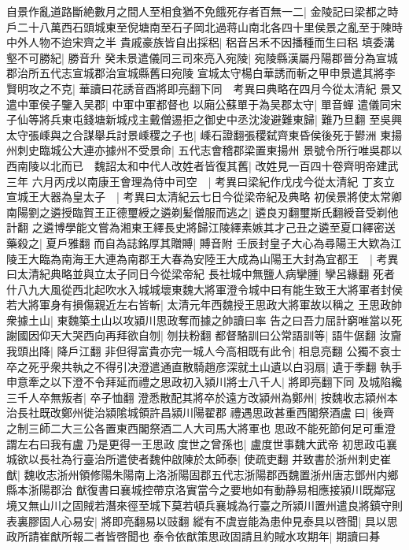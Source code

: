 自景作亂道路斷絶數月之間人至相食猶不免餓死存者百無一二|{
	金陵記曰梁都之時戶二十八萬西石頭城東至倪塘南至石子岡北過蒋山南北各四十里侯景之亂至于陳時中外人物不迨宋齊之半}
貴戚豪族皆自出採稆|{
	稆音呂禾不因播種而生曰稆}
填委溝壑不可勝紀|{
	勝音升}
癸未景遣儀同三司來亮入宛陵|{
	宛陵縣漢屬丹陽郡晉分為宣城郡治所五代志宣城郡治宣城縣舊曰宛陵}
宣城太守楊白華誘而斬之甲申景遣其將李賢明攻之不克|{
	華讀曰花誘音酉將即亮翻下同　考異曰典略在四月今從太清紀}
景又遣中軍侯子鑒入吴郡|{
	中軍中軍都督也}
以廂公蘇單于為吴郡太守|{
	單音蟬}
遣儀同宋子仙等將兵東屯錢塘新城戍主戴僧逷拒之御史中丞沈浚避難東歸|{
	難乃旦翻}
至吳興太守張嵊與之合謀舉兵討景嵊稷之子也|{
	嵊石證翻張稷弑齊東昏侯後死于鬰洲}
東揚州刺史臨城公大連亦據州不受景命|{
	五代志會稽郡梁置東揚州}
景號令所行唯吳郡以西南陵以北而已　魏詔太和中代人改姓者皆復其舊|{
	改姓見一百四十卷齊明帝建武三年}
六月丙戌以南康王會理為侍中司空　|{
	考異曰梁紀作戊戌今從太清紀}
丁亥立宣城王大器為皇太子　|{
	考異曰太清紀云七日今從梁帝紀及典略}
初侯景將使太常卿南陽劉之遴授臨賀王正德璽綬之遴剃髪僧服而逃之|{
	遴良刃翻璽斯氏翻綬音受剃他計翻}
之遴博學能文嘗為湘東王繹長史將歸江陵繹素嫉其才己丑之遴至夏口繹密送藥殺之|{
	夏戶雅翻}
而自為誌銘厚其贈賻|{
	賻音附}
壬辰封皇子大心為尋陽王大欵為江陵王大臨為南海王大連為南郡王大春為安陸王大成為山陽王大封為宜都王　|{
	考異曰太清紀典略並與立太子同日今從梁帝紀}
長社城中無鹽人病攣腫|{
	孿呂緣翻}
死者什八九大風從西北起吹水入城城壞東魏大將軍澄令城中曰有能生致王大將軍者封侯若大將軍身有損傷親近左右皆斬|{
	太清元年西魏授王思政大將軍故以稱之}
王思政帥衆據土山|{
	東魏築土山以攻潁川思政奪而據之帥讀曰率}
告之曰吾力屈計窮唯當以死謝國因仰天大哭西向再拜欲自刎|{
	刎扶粉翻}
都督駱訓曰公常語訓等|{
	語牛倨翻}
汝齎我頭出降|{
	降戶江翻}
非但得富貴亦完一城人今高相既有此令|{
	相息亮翻}
公獨不哀士卒之死乎衆共執之不得引决澄遣通直散騎趙彦深就土山遺以白羽扇|{
	遺于季翻}
執手申意牽之以下澄不令拜延而禮之思政初入潁川將士八千人|{
	將即亮翻下同}
及城陷纔三千人卒無叛者|{
	卒子恤翻}
澄悉散配其將卒於遠方改潁州為鄭州|{
	按魏收志潁州本治長社既改鄭州徙治潁隂城領許昌潁川陽翟郡}
禮遇思政甚重西閣祭酒盧曰|{
	後齊之制三師二大三公各置東西閣祭酒二人大司馬大將軍也}
思政不能死節何足可重澄謂左右曰我有盧乃是更得一王思政度世之曾孫也|{
	盧度世事魏大武帝}
初思政屯襄城欲以長社為行臺治所遣使者魏仲啟陳於太師泰|{
	使疏吏翻}
并致書於浙州刺史崔猷|{
	魏收志浙州領修陽朱陽南上洛浙陽固郡五代志浙陽郡西魏置浙州唐志鄧州内鄉縣本浙陽郡治}
猷復書曰襄城控帶京洛實當今之要地如有動静易相應接潁川既鄰寇境又無山川之固賊若潛來徑至城下莫若頓兵襄城為行臺之所潁川置州遣良將鎮守則表裏膠固人心易安|{
	將即亮翻易以豉翻}
縱有不虞豈能為患仲見泰具以啓聞|{
	具以思政所請崔猷所報二者皆啓聞也}
泰令依猷策思政固請且約賊水攻期年|{
	期讀曰朞}
